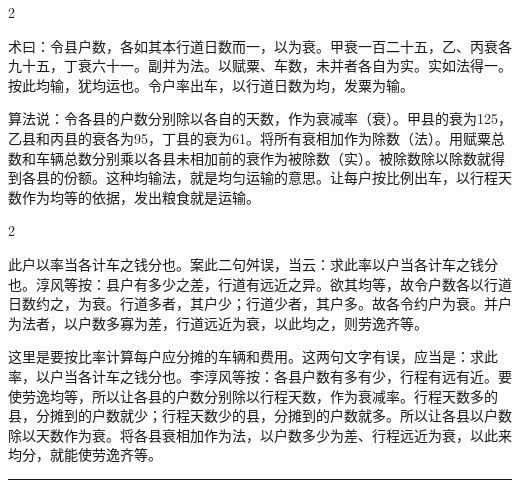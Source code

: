 \documentclass[11pt,a4paper]{article}
\newcommand{\longline}{\noindent\rule{\textwidth}{0.4pt}}
\begin{document}
\begin{paracol}{2}

\begin{methodbox}[\CJKfamily{rm}术 · 原文]
术曰：令县户数，各如其本行道日数而一，以为衰。甲衰一百二十五，乙、丙衰各九十五，丁衰六十一。副并为法。以赋粟、车数，未并者各自为实。实如法得一。按此均输，犹均运也。令户率出车，以行道日数为均，发粟为输。
\end{methodbox}

\switchcolumn

\begin{methodbox}
算法说：令各县的户数分别除以各自的天数，作为衰减率（衰）。甲县的衰为125，乙县和丙县的衰各为95，丁县的衰为61。将所有衰相加作为除数（法）。用赋粟总数和车辆总数分别乘以各县未相加前的衰作为被除数（实）。被除数除以除数就得到各县的份额。这种均输法，就是均匀运输的意思。让每户按比例出车，以行程天数作为均等的依据，发出粮食就是运输。
\end{methodbox}

\end{paracol}

\vspace{0.2cm}

\begin{paracol}{2}

\begin{commentarybox}
此户以率当各计车之钱分也。案此二句舛误，当云：求此率以户当各计车之钱分也。淳风等按：县户有多少之差，行道有远近之异。欲其均等，故令户数各以行道日数约之，为衰。行道多者，其户少；行道少者，其户多。故各令约户为衰。并户为法者，以户数多寡为差，行道远近为衰，以此均之，则劳逸齐等。
\end{commentarybox}

\switchcolumn

\begin{commentarybox}
这里是要按比率计算每户应分摊的车辆和费用。这两句文字有误，应当是：求此率，以户当各计车之钱分也。李淳风等按：各县户数有多有少，行程有远有近。要使劳逸均等，所以让各县的户数分别除以行程天数，作为衰减率。行程天数多的县，分摊到的户数就少；行程天数少的县，分摊到的户数就多。所以让各县以户数除以天数作为衰。将各县衰相加作为法，以户数多少为差、行程远近为衰，以此来均分，就能使劳逸齐等。
\end{commentarybox}

\end{paracol}

\vspace{0.5cm}
\longline
\vspace{0.3cm}
\end{document}
